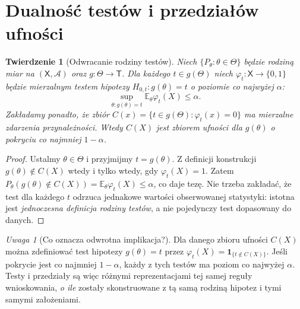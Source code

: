 \documentclass[11pt,a4paper,oneside]{report}
\numberwithin{equation}{chapter}
\theoremstyle{plain}
\newtheorem{twierdzenie}{Twierdzenie}[chapter]
\theoremstyle{definition}
\theoremstyle{remark}
\newtheorem{uwaga}{Uwaga}[chapter]
\newcommand{\E}{\mathbb E}
\newcommand{\ind}[1]{\mathbf 1_{#1}}
\begin{document}
\section{Dualność testów i przedziałów ufności}
\begin{twierdzenie}[Odwracanie rodziny testów]\label{thm:test-inversion}
Niech $\{P_\theta:\theta\in\Theta\}$ będzie rodziną miar
na $(\mathsf X,\mathcal A)$ oraz $g:\Theta\to\mathsf T$.
Dla każdego $t\in g(\Theta)$ niech $\varphi_t:\mathsf X\to\{0,1\}$
będzie mierzalnym testem hipotezy
$H_{0,t}:g(\theta)=t$ o poziomie co najwyżej $\alpha$:
\[
 \sup_{\theta:g(\theta)=t}\E_\theta\varphi_t(X)\le\alpha.
\]
Zakładamy ponadto, że zbiór
$C(x)=\{t\in g(\Theta):\varphi_t(x)=0\}$ ma mierzalne
zdarzenia przynależności. Wtedy $C(X)$ jest zbiorem ufności
dla $g(\theta)$ o pokryciu co najmniej $1-\alpha$.
\end{twierdzenie}
\begin{proof}
Ustalmy $\theta\in\Theta$ i przyjmijmy $t=g(\theta)$.
Z definicji konstrukcji $g(\theta)\notin C(X)$ wtedy i tylko
wtedy, gdy $\varphi_t(X)=1$. Zatem
$P_\theta(g(\theta)\notin C(X))
=\E_\theta\varphi_t(X)\le\alpha$, co daje tezę.
Nie trzeba zakładać, że test dla każdego $t$ odrzuca
jednakowe wartości obserwowanej statystyki: istotna jest
\emph{jednoczesna definicja rodziny testów}, a nie pojedynczy
test dopasowany do danych.
\end{proof}

\begin{uwaga}[Co oznacza odwrotna implikacja?]
Dla danego zbioru ufności $C(X)$ można zdefiniować test
hipotezy $g(\theta)=t$ przez
$\varphi_t(X)=\ind{\{t\notin C(X)\}}$. Jeśli
pokrycie jest co najmniej $1-\alpha$, każdy z tych testów ma
poziom co najwyżej $\alpha$. Testy i przedziały są więc
różnymi reprezentacjami tej samej reguły wnioskowania,
\emph{o ile} zostały skonstruowane z tą samą rodziną hipotez
i tymi samymi założeniami.
\end{uwaga}
\end{document}

